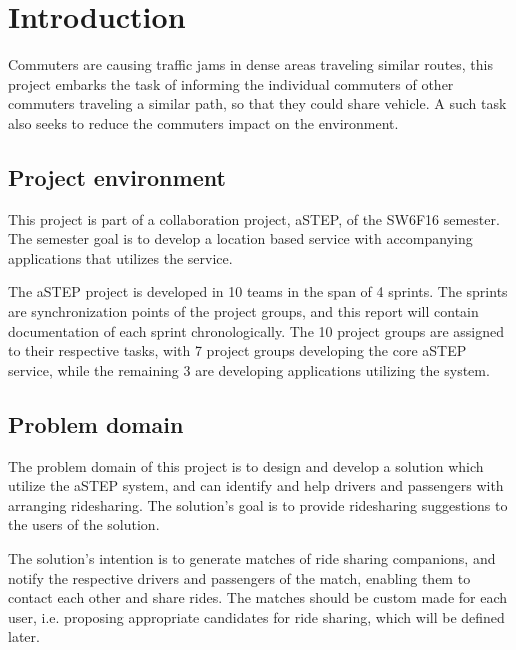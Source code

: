 \chapter{Introduction}\label{ch:introduction}


Commuters are causing traffic jams in dense areas traveling similar routes, this project embarks the task of informing the individual commuters of other commuters traveling a similar path, so that they could share vehicle.
A such task also seeks to reduce the commuters impact on the environment.


\section{Project environment}
This project is part of a collaboration project, aSTEP, of the SW6F16 semester.
The semester goal is to develop a location based service with accompanying applications that utilizes the service. 

The aSTEP project is developed in 10 teams in the span of 4 sprints.
The sprints are synchronization points of the project groups, and this report will contain documentation of each sprint chronologically.
The 10 project groups are assigned to their respective tasks, with 7 project groups developing the core aSTEP service, while the remaining 3 are developing applications utilizing the system.


\section{Problem domain}
The problem domain of this project is to design and develop a solution which utilize the aSTEP system, and can identify and help drivers and passengers with arranging ridesharing.
The solution's goal is to provide ridesharing suggestions to the users of the solution. 

The solution's intention is to generate matches of ride sharing companions, and notify the respective drivers and passengers of the match, enabling them to contact each other and share rides.
The matches should be custom made for each user, i.e. proposing appropriate candidates for ride sharing, which will be defined later.

